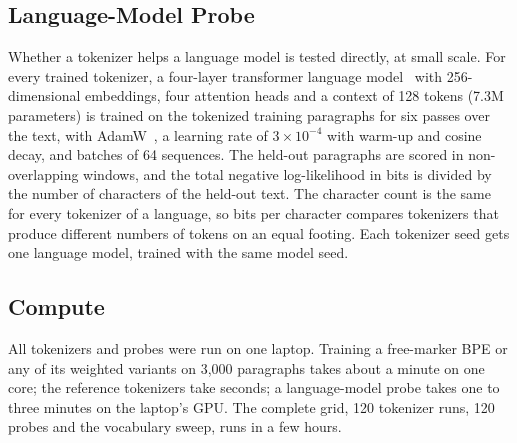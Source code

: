 \subsection{Language-Model Probe}
Whether a tokenizer helps a language model is tested directly, at small scale.
For every trained tokenizer, a four-layer transformer language model~\cite{vaswani2017attention} with 256-dimensional embeddings, four attention heads and a context of 128 tokens (7.3M parameters) is trained on the tokenized training paragraphs for six passes over the text, with AdamW~\cite{loshchilov2019adamw}, a learning rate of $3\times10^{-4}$ with warm-up and cosine decay, and batches of 64 sequences.
The held-out paragraphs are scored in non-overlapping windows, and the total negative log-likelihood in bits is divided by the number of characters of the held-out text.
The character count is the same for every tokenizer of a language, so bits per character compares tokenizers that produce different numbers of tokens on an equal footing.
Each tokenizer seed gets one language model, trained with the same model seed.

\subsection{Compute}
All tokenizers and probes were run on one laptop.
Training a free-marker BPE or any of its weighted variants on 3,000 paragraphs takes about a minute on one core; the reference tokenizers take seconds; a language-model probe takes one to three minutes on the laptop's GPU.
The complete grid, 120 tokenizer runs, 120 probes and the vocabulary sweep, runs in a few hours.
